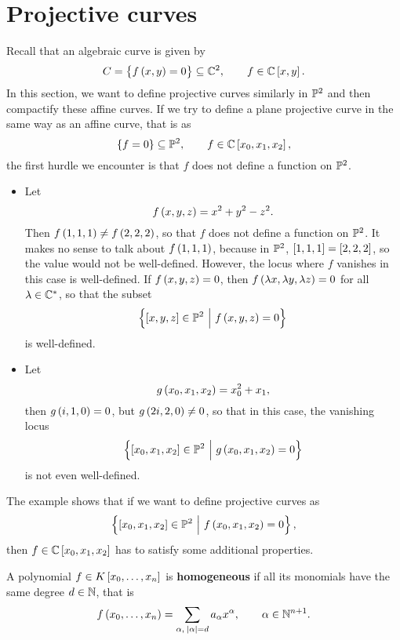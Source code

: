 \pagebreak

\section{Projective curves}


Recall that an algebraic curve is given by
$$ C = \cbr{f\br{x, y} = 0} \subseteq \CC^2, \qquad f \in \CC\sbr{x, y}. $$
In this section, we want to define projective curves similarly in $ \mathbb{P}^2 $ and then compactify these affine curves. If we try to define a plane projective curve in the same way as an affine curve, that is as
$$ \cbr{f = 0} \subseteq \PP^2, \qquad f \in \CC\sbr{x_0, x_1, x_2}, $$
the first hurdle we encounter is that $ f $ does not define a function on $ \mathbb{P}^2 $.

\begin{example}
\hfill
\begin{itemize}
\item Let
$$ f\br{x, y, z} = x^2 + y^2 - z^2. $$
Then $ f\br{1, 1, 1} \ne f\br{2, 2, 2} $, so that $ f $ does not define a function on $ \mathbb{P}^2 $. It makes no sense to talk about $ f\br{1, 1, 1} $, because in $ \mathbb{P}^2 $, $ \sbr{1, 1, 1} = \sbr{2, 2, 2} $, so the value would not be well-defined. However, the locus where $ f $ vanishes in this case is well-defined. If $ f\br{x, y, z} = 0 $, then $ f\br{\lambda x, \lambda y, \lambda z} = 0 $ for all $ \lambda \in \mathbb{C}^* $, so that the subset
$$ \cbr{\sbr{x, y, z} \in \PP^2 \st f\br{x, y, z} = 0} $$
is well-defined.
\item Let
$$ g\br{x_0, x_1, x_2} = x_0^2 + x_1, $$
then $ g\br{i, 1, 0} = 0 $, but $ g\br{2i, 2, 0} \ne 0 $, so that in this case, the vanishing locus
$$ \cbr{\sbr{x_0, x_1, x_2} \in \PP^2 \st g\br{x_0, x_1, x_2} = 0} $$
is not even well-defined.
\end{itemize}
\end{example}

The example shows that if we want to define projective curves as
$$ \cbr{\sbr{x_0, x_1, x_2} \in \PP^2 \st f\br{x_0, x_1, x_2} = 0}, $$
then $ f \in \CC\sbr{x_0, x_1, x_2} $ has to satisfy some additional properties.

\begin{definition}
A polynomial $ f \in K\sbr{x_0, \dots, x_n} $ is \textbf{homogeneous} if all its monomials have the same degree $ d \in \mathbb{N} $, that is
$$ f\br{x_0, \dots, x_n} = \sum_{\alpha, \ \abs{\alpha} = d} a_\alpha x^\alpha, \qquad \alpha \in \NN^{n + 1}. $$
\end{definition}

